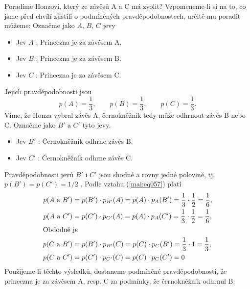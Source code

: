 \begin{mdframed}[style=mdexam]
\begin{example}
    Poradíme Honzovi, který ze závěsů A a C má zvolit? Vzpomeneme-li si na to, co jsme před chvílí
    zjistili o podmíněných pravděpodobnostech, určitě mu poradit můžeme: Označme jako \(A\), \(B\),
    \(C\) jevy
    \begin{itemize}
      \item Jev \(A\) : Princezna je za závěsem A.
      \item Jev \(B\) : Princezna je za závěsem B.
      \item Jev \(C\) : Princezna je za závěsem C.
    \end{itemize}
    Jejich pravděpodobnosti jsou
    \begin{equation*}
      p(A) = \dfrac{1}{3}, \qquad p(B) = \dfrac{1}{3}, \qquad p(C) = \dfrac{1}{3}.
    \end{equation*}
    Víme, že Honza vybral závěs A, černokněžník tedy může odhrnout závěs B nebo C. Označme jako
    \(B'\) a \(C'\) tyto jevy.
    \begin{itemize}
      \item Jev \(B'\) : Černokněžník odhrne závěs B.
      \item Jev \(C'\) : Černokněžník odhrne závěs C.
    \end{itemize}
    Pravděpodobnosti jevů \(B'\) i \(C'\) jsou shodné a rovny jedné polovině, tj. \(p(B') = p(C') =
    1/2\) . Podle vztahu (\ref{mai:eq057}) platí
      \begin{gather*}
        \begin{aligned}
        p(A\text{ a }B') &= p(B')\cdot p_{B'}(A) = p(A)\cdot p_{A}(B') 
                          = \dfrac{1}{3}\cdot\dfrac{1}{2} = \dfrac{1}{6},  \\
        p(A\text{ a }C') &= p(C')\cdot p_{C'}(A) = p(A)\cdot p_{A}(C')
                          = \dfrac{1}{3}\cdot\dfrac{1}{2} = \dfrac{1}{6},  \\
        \shortintertext{Obdodně je}
        p(C\text{ a }B') &= p(B')\cdot p_{B'}(C) = p(C)\cdot p_{C}(B')
                          = \dfrac{1}{3}\cdot1 = \dfrac{1}{3},              \\
        p(C\text{ a }C') &= p(C')\cdot p_{C'}(C) = p(C)\cdot p_{C}(C') = 0  \\
      \end{aligned}
    \end{gather*}
    Použijeme-li těchto výsledků, dostaneme podmíněné pravděpodobnosti, že princezna je za závěsem
    A, resp. C za podmínky, že černokněžník odhrnul B:
    \begin{align*}

\end{align*}
\end{example}
\end{mdframed}
